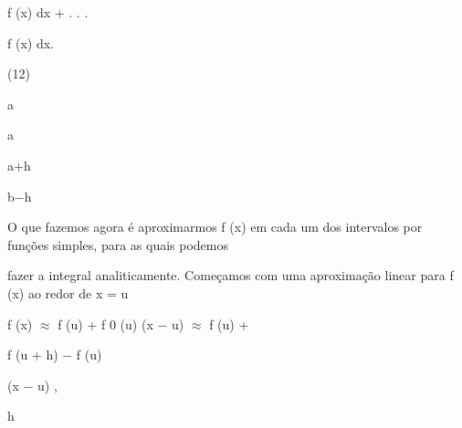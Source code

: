 \documentclass[a4paper,portrait,12pt]{article}
\begin{document}
\begin{flushleft}
f (x) dx + . . .
\end{flushleft}


\begin{flushleft}
f (x) dx.
\end{flushleft}


(12)


\begin{flushleft}
a
\end{flushleft}





\begin{flushleft}
a
\end{flushleft}





\begin{flushleft}
a+h
\end{flushleft}





\begin{flushleft}
b$-$h
\end{flushleft}





\begin{flushleft}
O que fazemos agora \'{e} aproximarmos f (x) em cada um dos intervalos por fun\c{c}\~{o}es simples, para as quais podemos
\end{flushleft}


\begin{flushleft}
fazer a integral analiticamente. Come\c{c}amos com uma aproxima\c{c}\~{a}o linear para f (x) ao redor de x = u
\end{flushleft}


\begin{flushleft}
f (x) $\approx$ f (u) + f 0 (u) (x $-$ u) $\approx$ f (u) +
\end{flushleft}





\begin{flushleft}
f (u + h) $-$ f (u)
\end{flushleft}


\begin{flushleft}
(x $-$ u) ,
\end{flushleft}


\begin{flushleft}
h
\end{flushleft}
\end{document}
